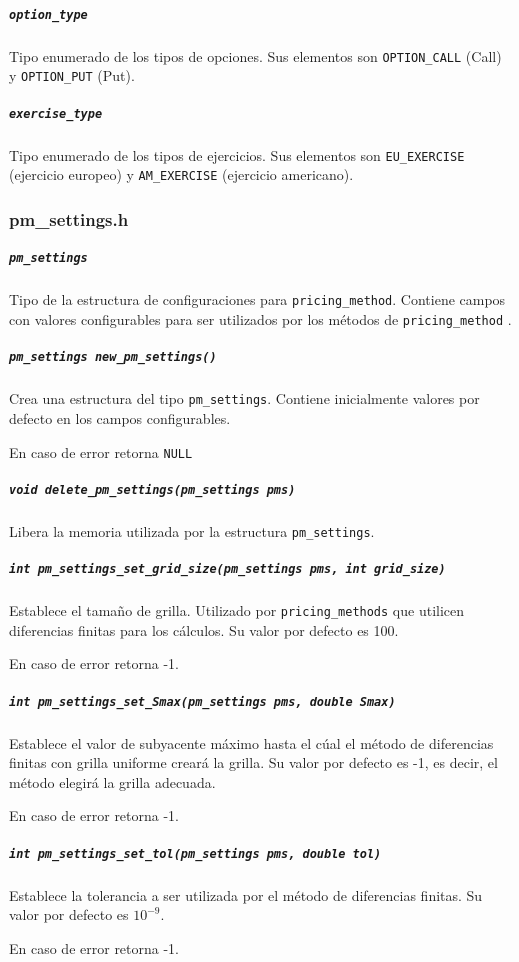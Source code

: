 \documentclass[12pt,a4paper,final]{article}
\begin{document}
			\subparagraph{\texttt{option\_type}}
				Tipo enumerado de los tipos de opciones. Sus elementos son \texttt{OPTION\_CALL} (Call) y 
				\texttt{OPTION\_PUT} (Put).
				
			\subparagraph{\texttt{exercise\_type}}
				Tipo enumerado de los tipos de ejercicios. Sus elementos son
				\texttt{EU\_EXERCISE} (ejercicio europeo) y \texttt{AM\_EXERCISE} (ejercicio americano).
				
		\subsubsection{pm\_settings.h}
			
			\subparagraph{\texttt{pm\_settings}}
				Tipo de la estructura de configuraciones para \texttt{pricing\_method}.
				Contiene campos con valores configurables para ser utilizados por los
				métodos de \texttt{pricing\_method}	.
		
			\subparagraph{\texttt{pm\_settings new\_pm\_settings()}}
				Crea una estructura del tipo \texttt{pm\_settings}. Contiene inicialmente
				valores por defecto en los campos configurables.
				
				En caso de error retorna \texttt{NULL}
				
			\subparagraph{\texttt{void delete\_pm\_settings(pm\_settings pms)}}
				Libera la memoria utilizada por la estructura \texttt{pm\_settings}.
				
			\subparagraph{\texttt{int pm\_settings\_set\_grid\_size(pm\_settings pms, int grid\_size)}}
				Establece el tamaño de grilla. Utilizado por \texttt{pricing\_methods} que utilicen diferencias
				finitas para los cálculos. Su valor por defecto es 100.
				
				En caso de error retorna -1.
				
			\subparagraph{\texttt{int pm\_settings\_set\_Smax(pm\_settings pms, double Smax)}}
				Establece el valor de subyacente máximo hasta el cúal el método de diferencias finitas
				con grilla uniforme creará la grilla. Su valor por defecto es -1, es decir, el método
				elegirá la grilla adecuada.
				
				En caso de error retorna -1.
				
			\subparagraph{\texttt{int pm\_settings\_set\_tol(pm\_settings pms, double tol)}}
				Establece la tolerancia a ser utilizada por el método de diferencias finitas.
				Su valor por defecto es $10^{-9}$.			
				
				En caso de error retorna -1.
			
\end{document}
